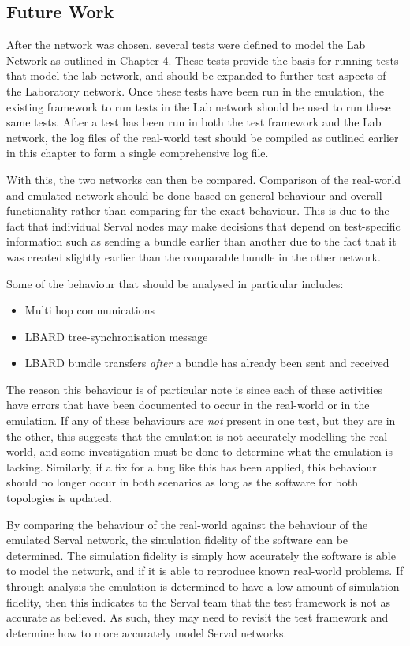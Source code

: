 \subsection{Future Work}
After the network was chosen, several tests were defined to model the Lab Network as outlined in Chapter 4.
These tests provide the basis for running tests that model the lab network, and should be expanded to further test aspects of the Laboratory network.
Once these tests have been run in the emulation, the existing framework to run tests in the Lab network should be used to run these same tests.
After a test has been run in both the test framework and the Lab network, the log files of the real-world test should be compiled as outlined earlier in this chapter to form a single comprehensive log file.

With this, the two networks can then be compared.
Comparison of the real-world and emulated network should be done based on general behaviour and overall functionality rather than comparing for the exact behaviour.
This is due to the fact that individual Serval nodes may make decisions that depend on test-specific information such as sending a bundle earlier than another due to the fact that it was created slightly earlier than the comparable bundle in the other network.

Some of the behaviour that should be analysed in particular includes:
\begin{itemize}
    \item Multi hop communications
    \item LBARD tree-synchronisation message
    \item LBARD bundle transfers \emph{after} a bundle has already been sent and received
\end{itemize}

The reason this behaviour is of particular note is since each of these activities have errors that have been documented to occur in the real-world or in the emulation.
If any of these behaviours are \emph{not} present in one test, but they are in the other, this suggests that the emulation is not accurately modelling the real world, and some investigation must be done to determine what the emulation is lacking.
Similarly, if a fix for a bug like this has been applied, this behaviour should no longer occur in both scenarios as long as the software for both topologies is updated.


By comparing the behaviour of the real-world against the behaviour of the emulated Serval network, the simulation fidelity of the software can be determined.
The simulation fidelity is simply how accurately the software is able to model the network, and if it is able to reproduce known real-world problems.
If through analysis the emulation is determined to have a low amount of simulation fidelity, then this indicates to the Serval team that the test framework is not as accurate as believed.
As such, they may need to revisit the test framework and determine how to more accurately model Serval networks.


